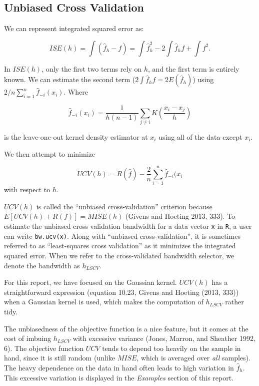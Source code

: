 \documentclass[]{article}
\begin{document}
\subsection{Unbiased Cross Validation}\label{unbiased-cross-validation}

We can represent integrated squared error as:

\[
ISE(h) = \int \left(\hat{f}_h - f\right) = \int\hat{f}_h^2 - 2\int \hat{f}_hf + \int f^2.
\]

In \(ISE(h)\), only the first two terms rely on \(h\), and the first
term is entirely known. We can estimate the second term
(\(2\int \hat{f}_hf = 2 E(\hat{f}_h)\)) using
\(2/n \sum_{i=1}^{n}\hat{f}_{-i}(x_i)\). Where

\[
\hat{f}_{-i}(x_i) = \frac{1}{h(n-1)}\sum_{j \neq i} K\left(\frac{x_i - x_j}{h}\right)
\]

is the leave-one-out kernel density estimator at \(x_i\) using all of
the data except \(x_i\).

We then attempt to minimize

\[
UCV(h) = R(\hat{f}) - \frac{2}{n} \sum_{i = 1}^{n} \hat{f}_{-i}(x_i
\] with respect to \(h\).

\(UCV(h)\) is called the ``unbiased cross-validation'' criterion because
\(E\left[UCV(h) + R(f)\right] = MISE(h)\) (Givens and Hoeting 2013,
333). To estimate the unbiased cross validation bandwidth for a data
vector \texttt{x} in \texttt{R}, a user can write \texttt{bw.ucv(x)}.
Along with ``unbiased cross-validation'', it is sometimes referred to as
``least-squares cross validation'' as it minimizes the integrated
squared error. When we refer to the cross-validated bandwidth selector,
we denote the bandwidth as \(h_{LSCV}\).

For this report, we have focused on the Gaussian kernel. \(UCV(h)\) has
a straightforward expression (equation 10.23, Givens and Hoeting (2013,
333)) when a Gaussian kernel is used, which makes the computation of
\(h_{LSCV}\) rather tidy.

The unbiasedness of the objective function is a nice feature, but it
comes at the cost of imbuing \(h_{LSCV}\) with excessive variance
(Jones, Marron, and Sheather 1992, 6). The objective function \(UCV\)
tends to depend too heavily on the sample in hand, since it is still
random (unlike \(MISE\), which is averaged over \emph{all} samples). The
heavy dependence on the data in hand often leads to high variation in
\(\hat{f}_h\). This excessive variation is displayed in the
\emph{Examples} section of this report.
\end{document}
